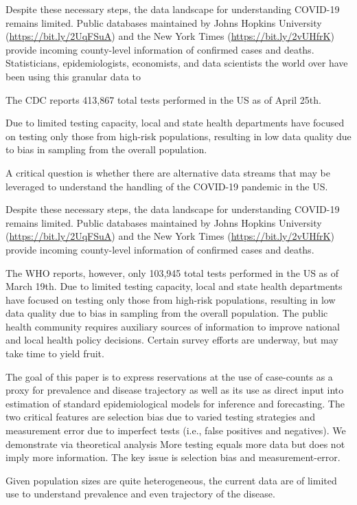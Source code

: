 \documentclass[11pt]{article}
\numberwithin{equation}{section}
\theoremstyle{plain}
\begin{document}
Despite these necessary steps, the data landscape for understanding COVID-19 remains limited.  Public databases maintained by Johns Hopkins University (\url{https://bit.ly/2UqFSuA}) and the New York Times (\url{https://bit.ly/2vUHfrK}) provide incoming county-level information of confirmed cases and deaths.  Statisticians, epidemiologists, economists, and data scientists the world over have been using this granular data to




The CDC reports 413,867 total tests performed in the US as of April 25th.

Due to limited testing capacity, local and state health departments have focused on testing only those from high-risk populations, resulting in low data quality due to bias in sampling from the overall population.

A critical question is whether there are alternative data streams that may be leveraged to understand the handling of the COVID-19 pandemic in the US.

Despite these necessary steps, the data landscape for understanding COVID-19 remains limited.  Public databases maintained by Johns Hopkins University (\url{https://bit.ly/2UqFSuA}) and the New York Times (\url{https://bit.ly/2vUHfrK}) provide incoming county-level information of confirmed cases and deaths.

The WHO reports, however, only 103,945 total tests performed in the US as of March 19th.  Due to limited testing capacity, local and state health departments have focused on testing only those from high-risk populations, resulting in low data quality due to bias in sampling from the overall population.  The public health community requires auxiliary sources of information to improve national and local health policy decisions.  Certain survey efforts are underway, but may take time to yield fruit.

The goal of this paper is to express reservations at the use of case-counts as a proxy for prevalence and disease trajectory as well as its use as direct input into estimation of standard epidemiological models for inference and forecasting.  The two critical features are selection bias due to varied testing strategies and measurement error due to imperfect tests (i.e., false positives and negatives).  We demonstrate via theoretical analysis
More testing equals more data but does not imply more information.  The key issue is selection bias and measurement-error.

Given population sizes are quite heterogeneous,
the current data are of limited use to understand prevalence and even trajectory of the disease.
\end{document}
